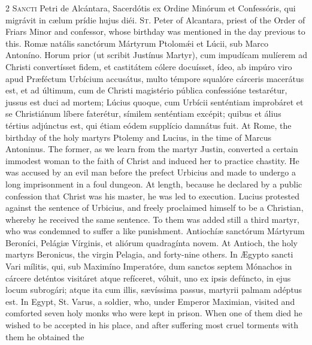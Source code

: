 \begin{paracol}{2}
\lettrine[lines=2]{S}{ancti} Petri de 
 Alcántara, Sacerdótis ex Ordine Minórum et Confessóris, qui migrávit in 
 cælum prídie hujus diéi.
\switchcolumn
{}
\lettrine[lines=2]{S}{t.} Peter of Alcantara, priest of 
 the Order of Friars Minor and confessor, whose birthday was mentioned in the 
 day previous to this.
\switchcolumn*
{}
Romæ natális sanctórum 
 Mártyrum Ptolomǽi et Lúcii, sub Marco Antoníno. Horum prior (ut 
	scribit Justínus Martyr), cum impud\'icam mulíerem ad Christi convertísset 
 fidem, et castitátem cólere docuísset, ídeo, ab impúro viro apud Præféctum 
 Urbícium accusátus, multo témpore squalóre cárceris macerátus est, et ad 
 últimum, cum de Christi magistério pública confessióne testarétur, jussus 
 est duci ad mortem; Lúcius quoque, cum Urbícii senténtiam improbáret et se 
 Christiánum líbere faterétur, símilem senténtiam excépit; quibus et álius 
 tértius adjúnctus est, qui étiam eódem supplício damnátus fuit.
\switchcolumn
{}
At Rome, the birthday of the holy 
 martyrs Ptolemy and Lucius, in the time of Marcus Antoninus. The 
 former, as we learn from the martyr Justin, converted a certain immodest 
 woman to the faith of Christ and induced her to practice chastity. He 
 was accused by an evil man before the prefect Urbicius and made to undergo a 
 long imprisonment in a foul dungeon. At length, because he declared by 
 a public confession that Christ was his master, he was led to execution. 
 Lucius protested against the sentence of Urbicius, and freely proclaimed 
 himself to be a Christian, whereby he received the same sentence. To 
 them was added still a third martyr, who was condemned to suffer a like 
 punishment.
\switchcolumn*
{}
Antiochíæ sanctórum 
 Mártyrum Beroníci, Pelágiæ Vírginis, et aliórum quadragínta novem.
\switchcolumn
{}
At Antioch, the holy martyrs 
 Beronicus, the virgin Pelagia, and forty-nine others.
\switchcolumn*
{}
In Ægypto sancti Vari 
 mílitis, qui, sub Maximíno Imperatóre, dum sanctos septem Mónachos in cárcere deténtos visitáret atque refíceret, vóluit, uno ex ipsis defúncto, 
 in ejus locum subrogári; atque ita cum illis, sævíssima passus, martyrii 
 palmam adéptus est.
\switchcolumn
{}
In Egypt, St. Varus, a soldier, who, 
 under Emperor Maximian, visited and comforted seven holy monks who were kept 
 in prison. When one of them died he wished to be accepted in his 
 place, and after suffering most cruel torments with them he obtained the 

\end{paracol}
